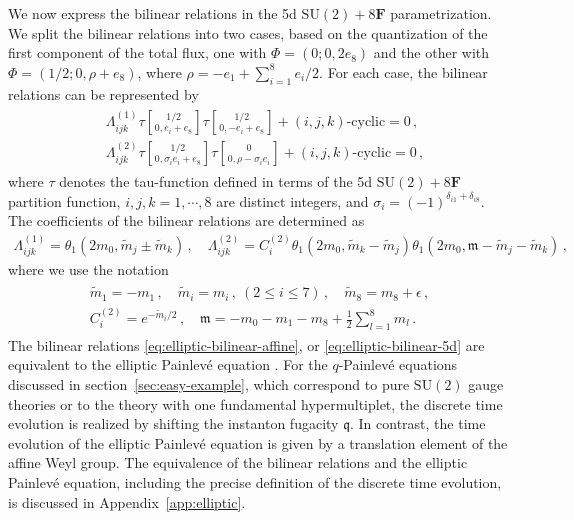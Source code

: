 \documentclass[11pt, a4paper]{article}
\newcommand{\tauftn}[2]{\tau\genfrac[]{0pt}{1}{#1}{#2}}
\theoremstyle{definition}
\begin{document}
We now express the bilinear relations in the 5d $ \mathrm{SU}(2)+8\mathbf{F} $ parametrization. We split the bilinear relations into two cases, based on the quantization of the first component of the total flux, one with $ \Phi = (0; 0,2e_8) $ and the other with $ \Phi = (1/2; 0, \rho+e_8) $, where $ \rho = -e_1 + \sum_{i=1}^8 e_i/2 $. For each case, the bilinear relations can be represented by
\begin{align}
    \begin{aligned}\label{eq:elliptic-bilinear-5d}
        &\Lambda_{ijk}^{(1)} \tauftn{1/2}{0, e_i+e_8} \tauftn{1/2}{0, -e_i+e_8} + (i,j,k)\text{-cyclic} = 0 \, , \\
        &\Lambda_{ijk}^{(2)} \tauftn{1/2}{0,\sigma_i e_i+e_8} \tauftn{0}{0,\rho- \sigma_i e_i} + (i,j,k)\text{-cyclic} = 0 \, ,
    \end{aligned}
\end{align}
where $ \tau $ denotes the tau-function defined in terms of the 5d $ \mathrm{SU}(2)+8\mathbf{F} $ partition function, $ i,j,k=1,\cdots,8 $ are distinct integers, and $ \sigma_i = (-1)^{\delta_{i1}+\delta_{i8}} $. The coefficients of the bilinear relations are determined as
\begin{align}
    \Lambda_{ijk}^{(1)} = \theta_1(2m_0, \tilde{m}_j \pm \tilde{m}_k) \, , \quad
    \Lambda_{ijk}^{(2)} = C_i^{(2)} \theta_1(2m_0, \tilde{m}_k-\tilde{m}_j) \theta_1(2m_0, \mathfrak{m}-\tilde{m}_j-\tilde{m}_k) \, ,
\end{align}
where we use the notation
\begin{gather}
    \begin{gathered}
        \tilde{m}_1 = -m_1 \, , \quad
        \tilde{m}_i = m_i \, , \ (2 \leq i \leq 7) \, , \quad
        \tilde{m}_8 = m_8 + \epsilon \, , \\
        C_i^{(2)} = e^{-\tilde{m}_i/2} \, , \quad
        \mathfrak{m} = -m_0 - m_1 - m_8 + \frac{1}{2}\sum_{l=1}^8 m_l \, .
    \end{gathered}
\end{gather}
The bilinear relations \eqref{eq:elliptic-bilinear-affine}, or \eqref{eq:elliptic-bilinear-5d} are equivalent to the elliptic Painlev\'e equation \cite{Kajiwara:2003, Kajiwara:2004, Masuda:2011, Kajiwara:2015}. For the $ q $-Painlev\'e equations discussed in section~\ref{sec:easy-example}, which correspond to pure $ \mathrm{SU}(2) $ gauge theories or to the theory with one fundamental hypermultiplet, the discrete time evolution is realized by shifting the instanton fugacity $ \mathfrak{q} $. In contrast, the time evolution of the elliptic Painlev\'e equation is given by a translation element of the affine Weyl group. The equivalence of the bilinear relations and the elliptic Painlev\'e equation, including the precise definition of the discrete time evolution, is discussed in Appendix~\ref{app:elliptic}.
\end{document}
